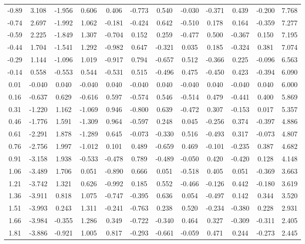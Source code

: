 {\begin{table}[H]
\begin{center}
{\begin{tabular}{|c|cccccccccc|c|}
-0.89
& 3.108 & -1.956 & 0.606 & 0.406 & -0.773 & 0.540 & -0.030 & -0.371 & 0.439 & -0.200 & 7.768 \\
-0.74
& 2.697 & -1.992 & 1.062 & -0.181 & -0.424 & 0.642 & -0.510 & 0.178 & 0.164 & -0.359 & 7.277 \\
-0.59
& 2.225 & -1.849 & 1.307 & -0.704 & 0.152 & 0.259 & -0.477 & 0.500 & -0.367 & 0.150 & 7.195 \\
-0.44
& 1.704 & -1.541 & 1.292 & -0.982 & 0.647 & -0.321 & 0.035 & 0.185 & -0.324 & 0.381 & 7.074 \\
-0.29
& 1.144 & -1.096 & 1.019 & -0.917 & 0.794 & -0.657 & 0.512 & -0.366 & 0.225 & -0.096 & 6.563 \\
-0.14
& 0.558 & -0.553 & 0.544 & -0.531 & 0.515 & -0.496 & 0.475 & -0.450 & 0.423 & -0.394 & 6.090 \\
0.01
& -0.040 & 0.040 & -0.040 & 0.040 & -0.040 & 0.040 & -0.040 & 0.040 & -0.040 & 0.040 & 6.000 \\
0.16
& -0.637 & 0.629 & -0.616 & 0.597 & -0.574 & 0.546 & -0.514 & 0.479 & -0.441 & 0.400 & 5.869 \\
0.31
& -1.220 & 1.162 & -1.069 & 0.946 & -0.800 & 0.639 & -0.472 & 0.307 & -0.153 & 0.017 & 5.357 \\
0.46
& -1.776 & 1.591 & -1.309 & 0.964 & -0.597 & 0.248 & 0.045 & -0.256 & 0.374 & -0.397 & 4.886 \\
0.61
& -2.291 & 1.878 & -1.289 & 0.645 & -0.073 & -0.330 & 0.516 & -0.493 & 0.317 & -0.073 & 4.807 \\
0.76
& -2.756 & 1.997 & -1.012 & 0.101 & 0.489 & -0.659 & 0.469 & -0.101 & -0.235 & 0.387 & 4.682 \\
0.91
& -3.158 & 1.938 & -0.533 & -0.478 & 0.789 & -0.489 & -0.050 & 0.420 & -0.420 & 0.128 & 4.148 \\
1.06
& -3.489 & 1.706 & 0.051 & -0.890 & 0.666 & 0.051 & -0.518 & 0.405 & 0.051 & -0.369 & 3.663 \\
1.21
& -3.742 & 1.321 & 0.626 & -0.992 & 0.185 & 0.552 & -0.466 & -0.126 & 0.442 & -0.180 & 3.619 \\
1.36
& -3.911 & 0.818 & 1.075 & -0.747 & -0.395 & 0.636 & 0.054 & -0.497 & 0.142 & 0.344 & 3.520 \\
1.51
& -3.993 & 0.243 & 1.311 & -0.241 & -0.763 & 0.238 & 0.520 & -0.234 & -0.380 & 0.228 & 2.931 \\
1.66
& -3.984 & -0.355 & 1.286 & 0.349 & -0.722 & -0.340 & 0.464 & 0.327 & -0.309 & -0.311 & 2.405 \\
1.81
& -3.886 & -0.921 & 1.005 & 0.817 & -0.293 & -0.661 & -0.059 & 0.471 & 0.244 & -0.273 & 2.445 \\

\end{tabular}}
\end{center}
\end{table}}
